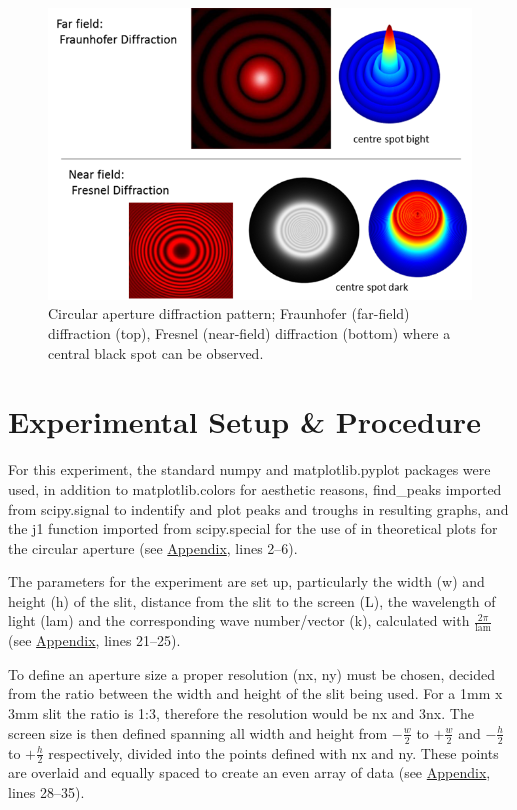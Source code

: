 \documentclass[12pt]{article}
\begin{document}
\begin{figure}[H]
    \centering
    \includegraphics[width=.55\textwidth]{circularapert.png}
    \caption{Circular aperture diffraction pattern; Fraunhofer (far-field) diffraction (top), Fresnel (near-field) diffraction (bottom) where a central black spot can be observed. \cite{VisualPhysics_singleSlit}}
    \label{fig:6}
\end{figure}

\section{Experimental Setup \& Procedure} \label{sec:3}

For this experiment, the standard numpy and matplotlib.pyplot packages were used, in addition to matplotlib.colors for aesthetic reasons,
find\_peaks imported from scipy.signal to indentify and plot peaks and troughs in resulting graphs, and the j1 function imported from scipy.special 
for the use of in theoretical plots for the circular aperture (see \hyperref[sec:A]{Appendix}, lines 2–6).

The parameters for the experiment are set up, particularly the width (w) and height (h) of the slit, distance from the slit to the screen (L), the wavelength of light (lam) and the
corresponding wave number/vector (k), calculated with \( \frac{2 \pi}{\text{lam}} \) (see \hyperref[sec:A]{Appendix}, lines 21–25).

To define an aperture size a proper resolution (nx, ny) must be chosen, decided from the ratio between the width and height of the slit being used. For a 1mm x 3mm slit the ratio is 1:3,
therefore the resolution would be nx and 3nx. The screen size is then defined spanning all width and height from \( -\frac{w}{2} \) to \( +\frac{w}{2} \) and \( -\frac{h}{2} \) to \( +\frac{h}{2} \) respectively, divided into the points defined with nx and ny. These
points are overlaid and equally spaced to create an even array of data (see \hyperref[sec:A]{Appendix}, lines 28–35).
\end{document}
